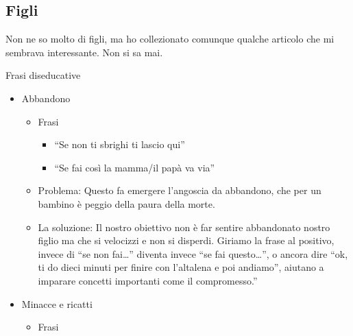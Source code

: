 \documentclass[12pt]{book} %
\begin{document}
\subsection{Figli}
Non ne so molto di figli, ma ho collezionato comunque qualche articolo che mi sembrava interessante. Non si sa mai.

Frasi diseducative

\begin{itemize}
\item Abbandono

\begin{itemize}
\item Frasi

\begin{itemize}
\item “Se non ti sbrighi ti lascio qui”
\item “Se fai così la mamma/il papà va via”
\end{itemize}
\item Problema: Questo fa emergere l'angoscia da abbandono, che per un bambino è peggio della paura della morte.
\item La soluzione: Il nostro obiettivo non è far sentire abbandonato nostro figlio ma che si velocizzi e non si
disperdi. Giriamo la frase al positivo, invece di “se non fai…” diventa invece “se fai questo…”, o ancora dire “ok, ti
do dieci minuti per finire con l'altalena e poi andiamo”, aiutano a imparare concetti importanti
come il compromesso.”
\end{itemize}
\item Minacce e ricatti

\begin{itemize}
\item Frasi


\end{itemize}
\end{itemize}
\end{document}
